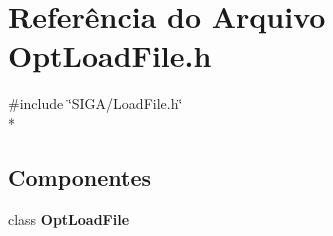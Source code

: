 \section{Referência do Arquivo Opt\+Load\+File.\+h}
\label{_opt_load_file_8h}
{\ttfamily \#include \char`\"{}S\+I\+G\+A/\+Load\+File.\+h\char`\"{}}\\*
\subsection*{Componentes}
\begin{DoxyCompactItemize}
\item 
class {\bf Opt\+Load\+File}
\end{DoxyCompactItemize}
